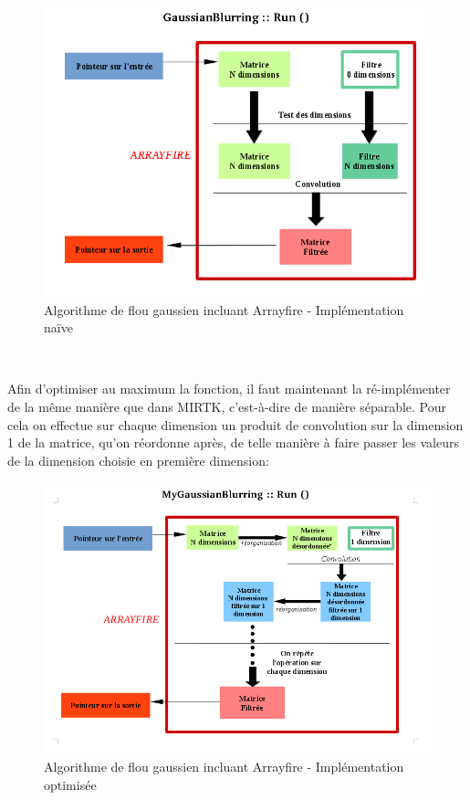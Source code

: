 \documentclass[10pt]{report}
\begin{document}
	\begin{figure}[h!]
		\begin{center}
			\includegraphics[width=11cm]{Reports/figures/gaussianblurring.png}
		\end{center}	
		\caption{Algorithme de flou gaussien incluant Arrayfire - Implémentation naïve}
		\label{Algorithme de flou gaussien incluant Arrayfire - Implémentation naïve}
	\end{figure}~\par
	Afin d'optimiser au maximum la fonction, il faut maintenant la ré-implémenter de la même manière que dans MIRTK, c'est-à-dire de manière séparable. Pour cela on effectue sur chaque dimension un produit de convolution sur la dimension 1 de la matrice, qu'on réordonne après, de telle manière à faire passer les valeurs de la dimension choisie en première dimension: \\
	\begin{figure}[h!]
		\begin{center}
			\includegraphics[width=12cm]{Reports/figures/mygaussianblurring.png}
		\end{center}	
		\caption{Algorithme de flou gaussien incluant Arrayfire - Implémentation optimisée}
		\label{Algorithme de flou gaussien incluant Arrayfire - Implémentation optimisée}
	\end{figure}~\par
\end{document}
